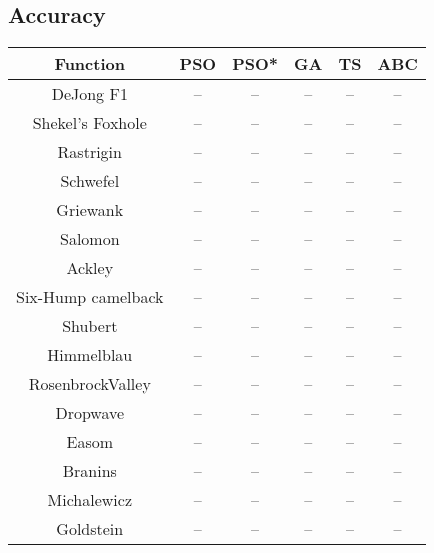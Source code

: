 \subsection{Accuracy}
\begin{center}
	\begin{tabular}{| c | c | c | c | c | c |}
	\hline
	Function & PSO & PSO* & GA & TS & ABC\\  \hline
	DeJong F1 & -- & -- & -- & -- & --\\ \hline
	Shekel's Foxhole & -- & -- & -- & -- & --\\ \hline
	Rastrigin & -- & -- & -- & -- & --\\ \hline
	Schwefel & -- & -- & -- & -- & --\\ \hline
	Griewank & -- & -- & -- & -- & --\\ \hline
	Salomon & -- & -- & -- & -- & --\\ \hline
	Ackley & -- & -- & -- & -- & --\\ \hline
	Six-Hump camelback & -- & -- & -- & -- & --\\ \hline
	Shubert & -- & -- & -- & -- & --\\ \hline
	Himmelblau & -- & -- & -- & -- & --\\ \hline
	RosenbrockValley & -- & -- & -- & -- & --\\ \hline
	Dropwave & -- & -- & -- & -- & --\\ \hline
	Easom & -- & -- & -- & -- & --\\ \hline
	Branins & -- & -- & -- & -- & --\\ \hline
	Michalewicz & -- & -- & -- & -- & --\\ \hline
	Goldstein & -- & -- & -- & -- & --\\ \hline
	\end{tabular}
\end{center}
